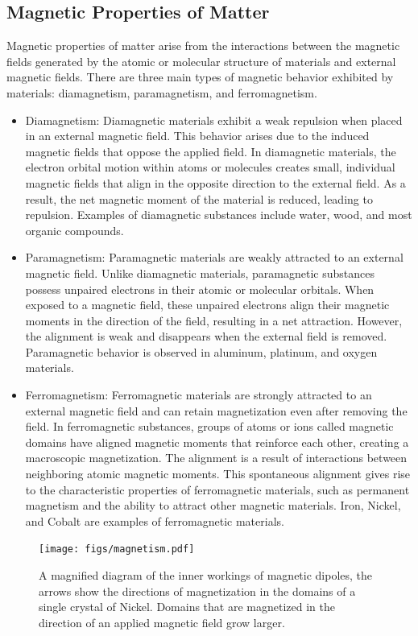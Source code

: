 \documentclass[12pt,b4paper]{article}
\begin{document}
\subsection{Magnetic Properties of Matter}
Magnetic properties of matter arise from the interactions between the magnetic fields generated by the atomic or molecular structure of materials and external magnetic fields. There are three main types of magnetic behavior exhibited by materials: diamagnetism, paramagnetism, and ferromagnetism.
\begin{itemize}
\setlength{\itemsep}{0pt}
    \item Diamagnetism: Diamagnetic materials exhibit a weak repulsion when placed in an external magnetic field. This behavior arises due to the induced magnetic fields that oppose the applied field. In diamagnetic materials, the electron orbital motion within atoms or molecules creates small, individual magnetic fields that align in the opposite direction to the external field. As a result, the net magnetic moment of the material is reduced, leading to repulsion. Examples of diamagnetic substances include water, wood, and most organic compounds.
    \item Paramagnetism: Paramagnetic materials are weakly attracted to an external magnetic field. Unlike diamagnetic materials, paramagnetic substances possess unpaired electrons in their atomic or molecular orbitals. When exposed to a magnetic field, these unpaired electrons align their magnetic moments in the direction of the field, resulting in a net attraction. However, the alignment is weak and disappears when the external field is removed. Paramagnetic behavior is observed in aluminum, platinum, and oxygen materials.
    \item Ferromagnetism: Ferromagnetic materials are strongly attracted to an external magnetic field and can retain magnetization even after removing the field. In ferromagnetic substances, groups of atoms or ions called magnetic domains have aligned magnetic moments that reinforce each other, creating a macroscopic magnetization. The alignment is a result of interactions between neighboring atomic magnetic moments. This spontaneous alignment gives rise to the characteristic properties of ferromagnetic materials, such as permanent magnetism and the ability to attract other magnetic materials. Iron, Nickel, and Cobalt are examples of ferromagnetic materials.
\end{itemize}
\begin{figure}[H]
    \centering
    \texttt{[image: figs/magnetism.pdf]}
    \caption{A magnified diagram of the inner workings of magnetic dipoles, the arrows show the directions of magnetization in the domains of a single crystal of Nickel. Domains that are magnetized in the direction of an applied magnetic field grow larger.}
    \label{fig:magnetism}
\end{figure}
\end{document}
